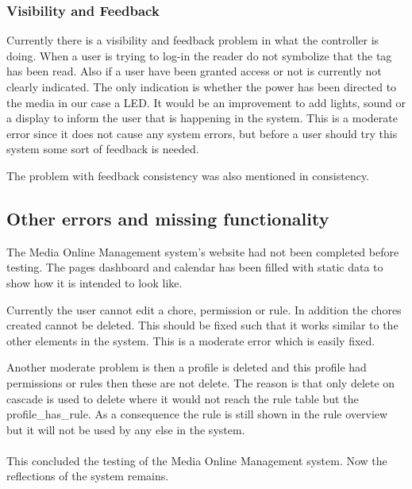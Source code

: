 \subsubsection{Visibility and Feedback}
Currently there is a visibility and feedback problem in what the controller is doing. When a user is trying to log-in the reader do not symbolize that the tag has been read. Also if a user have been granted access or not is currently not clearly indicated. The only indication is whether the power has been directed to the media in our case a LED. It would be an improvement to add lights, sound or a display to inform the user that is happening in the system. This is a moderate error since it does not cause any system errors, but before a user should try this system some sort of feedback is needed.

The problem with feedback consistency was also mentioned in consistency.    


\subsection{Other errors and missing functionality}
The Media Online Management system's website had not been completed before testing. The pages dashboard and calendar has been filled with static data to show how it is intended to look like. 

Currently the user cannot edit a chore, permission or rule. In addition the chores created cannot be deleted. This should be fixed such that it works similar to the other elements in the system. This is a moderate error which is easily fixed.

Another moderate problem is then a profile is deleted and this profile had permissions or rules then these are not delete. The reason is that only delete on cascade is used to delete where it would not reach the rule table but the profile\_has\_rule. As a consequence the rule is still shown in the rule overview but it will not be used by any else in the system.\\\\

This concluded the testing of the Media Online Management system. Now the reflections of the system remains. 
 

   

